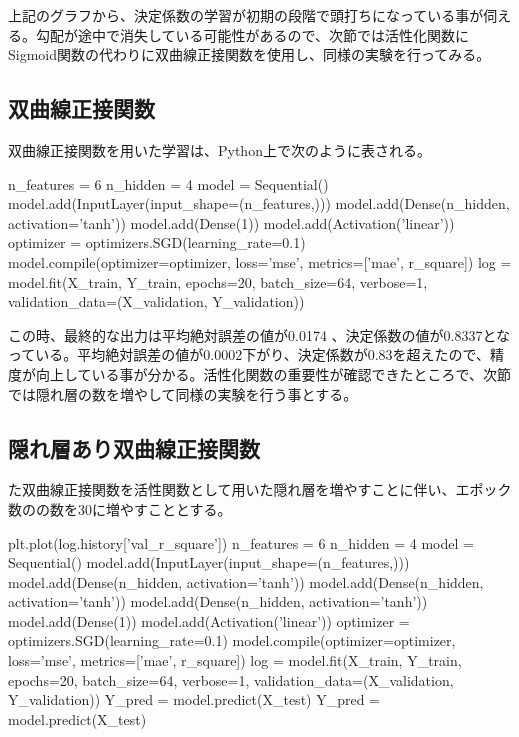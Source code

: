 \documentclass{article}
\begin{document}
上記のグラフから、決定係数の学習が初期の段階で頭打ちになっている事が伺える。勾配が途中で消失している可能性があるので、次節では活性化関数にSigmoid関数の代わりに双曲線正接関数を使用し、同様の実験を行ってみる。

\subsection{双曲線正接関数}

双曲線正接関数を用いた学習は、Python上で次のように表される。
\\

\begin{python}
n_features = 6
n_hidden   = 4
model = Sequential()
model.add(InputLayer(input_shape=(n_features,)))
model.add(Dense(n_hidden, activation='tanh'))
model.add(Dense(1))
model.add(Activation('linear'))
optimizer = optimizers.SGD(learning_rate=0.1)
model.compile(optimizer=optimizer,
              loss='mse', metrics=['mae', r_square])
log = model.fit(X_train, Y_train, epochs=20, batch_size=64, 
verbose=1,
         validation_data=(X_validation, Y_validation))
\end{python}

この時、最終的な出力は平均絶対誤差の値が0.0174 、決定係数の値が0.8337となっている。平均絶対誤差の値が0.0002下がり、決定係数が0.83を超えたので、精度が向上している事が分かる。活性化関数の重要性が確認できたところで、次節では隠れ層の数を増やして同様の実験を行う事とする。


\subsection{隠れ層あり双曲線正接関数}


た双曲線正接関数を活性関数として用いた隠れ層を増やすことに伴い、エポック数のの数を30に増やすこととする。
\\


\begin{python}
plt.plot(log.history['val_r_square'])
n_features = 6
n_hidden   = 4
model = Sequential()
model.add(InputLayer(input_shape=(n_features,)))
model.add(Dense(n_hidden, activation='tanh'))
model.add(Dense(n_hidden, activation='tanh'))
model.add(Dense(n_hidden, activation='tanh'))
model.add(Dense(1))
model.add(Activation('linear'))
optimizer = optimizers.SGD(learning_rate=0.1)
model.compile(optimizer=optimizer,
              loss='mse', metrics=['mae', r_square])
log = model.fit(X_train, Y_train, epochs=20, batch_size=64, 
verbose=1,
         validation_data=(X_validation, Y_validation))
Y_pred = model.predict(X_test)
Y_pred = model.predict(X_test)
\end{python}
\end{document}
